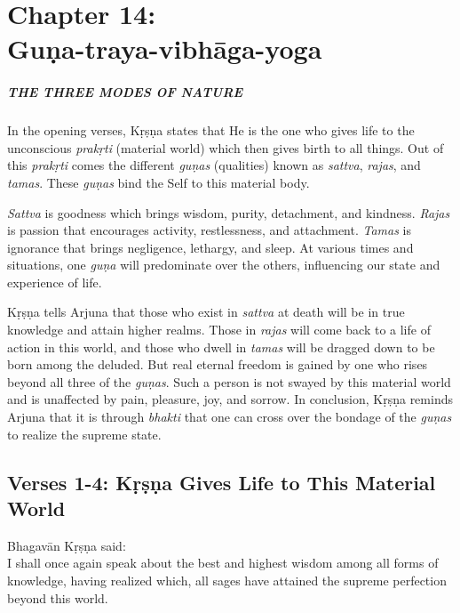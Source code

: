 \chapter{Chapter 14: \\Guṇa-traya-vibhāga-yoga}\label{chap-guna-traya-vibhaga-yoga}

\paragraph*{\MakeUppercase{The Three Modes of Nature}}

\noindent In the opening verses, Kṛṣṇa states that He is the one who gives life to the unconscious \textit{prakṛti} (material world) which then gives birth to all things. Out of this \textit{prakṛti} comes the different \textit{guṇas} (qualities) known as \textit{sattva}, \textit{rajas}, and \textit{tamas}. These \textit{guṇas} bind the Self to this material body.

\textit{Sattva} is goodness which brings wisdom, purity, detachment, and kindness. \textit{Rajas} is passion that encourages activity, restlessness, and attachment. \textit{Tamas} is ignorance that brings negligence, lethargy, and sleep. At various times and situations, one \textit{guṇa} will predominate over the others, influencing our state and experience of life.

Kṛṣṇa tells Arjuna that those who exist in \textit{sattva} at death will be in true knowledge and attain higher realms. Those in \textit{rajas} will come back to a life of action in this world, and those who dwell in \textit{tamas} will be dragged down to be born among the deluded. But real eternal freedom is gained by one who rises beyond all three of the \textit{guṇas}. Such a person is not swayed by this material world and is unaffected by pain, pleasure, joy, and sorrow. In conclusion, Kṛṣṇa reminds Arjuna that it is through \textit{bhakti} that one can cross over the bondage of the \textit{guṇas} to realize the supreme state.

\section{Verses 1-4: Kṛṣṇa Gives Life to This Material World}\label{sec-verses-1-4-krsna-gives-life-to-this-material-world}


{\hspace*{1em}Bhagavān Kṛṣṇa said: \\
I shall once again speak about the best and highest wisdom among all forms of knowledge, having realized which, all sages have attained the supreme perfection beyond this world.}


